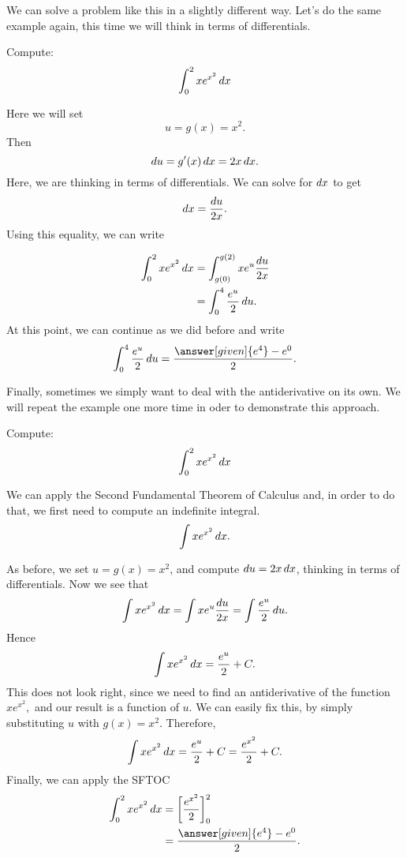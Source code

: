 \documentclass{ximera}
\begin{document}
We can solve a problem like this in a slightly different
way. Let's do the same example again, this time we will think in terms
of differentials.

\begin{example}\label{main example}
Compute:
\[
\int_0^2 x e^{x^2}\mathop{}\!d x
\]
\begin{explanation}
Here we will set
\[ u=g(x) = x^2.
\]
 Then
 \[
 \mathop{}\!d u =g'(x)\mathop{}\!d x=2x\mathop{}\!d x.
 \]
Here, we are thinking in terms of differentials.
We can solve for $\mathop{}\!d x$ to get
\[
\mathop{}\!d x = \frac{\mathop{}\!d u}{2x}.
\]
Using this equality, we can write

\begin{align*}
\int_0^2 x e^{x^2}\mathop{}\!d x &= \int_{g(0)}^{g(2)} x  e^{u} \frac{\mathop{}\!d u}{2x}\\
  &= \int_{0}^{4} \frac{e^u}{2}\mathop{}\!d u .
\end{align*}
At this point, we can continue as we did before and write
\[
 \int_{0}^{4} \frac{e^u}{2}\d u= \frac{\answer[given]{e^4} -e^0}{2}.
\]
\end{explanation}
\end{example}

Finally, sometimes we simply want to deal with the antiderivative on
its own.  We will repeat the example one more time in oder to demonstrate this approach.

\begin{example}
Compute:
\[
\int_0^2 x e^{x^2}\mathop{}\!d x
\]
\begin{explanation}
We can apply the Second Fundamental Theorem of Calculus and, in order to do that, we first need to compute an indefinite integral.
\[
\int  x e^{x^2} \mathop{}\!d x.
\]

As before, we set $u=g(x)=x^2$, and compute $\mathop{}\!d u =  2x \mathop{}\!d x$,
 thinking in terms of differentials. Now we see that
\[
\int   x e^{x^2} \mathop{}\!d x = \int x e^{u} \frac{\mathop{}\!d u}{2x} = \int \frac{e^{u}}{2}\mathop{}\!d u .
\]
Hence
\[
\int  x e^{x^2} \mathop{}\!d x = \frac{e^{u}}{2}+C .
\]
This does not look right, since  we need to find an antiderivative of the function $ x e^{x^2},$ and our result is a function of $u$.
We can easily fix this, by simply substituting $u$ with $g(x)=x^2$.
Therefore,
\[
\int xe^{x^2}\mathop{}\!d x =\frac{e^{u}}{2}+C= \frac{e^{x^2}}{2}+C .
\]
Finally, we can apply the SFTOC
\begin{align*}
\int_0^2 x e^{x^2}\d x &=\eval{\frac{e^{x^2}}{2}}_0^2\\
&= \frac{\answer[given]{e^4} -e^0}{2}.
\end{align*}
\end{explanation}
\end{example}
\end{document}
